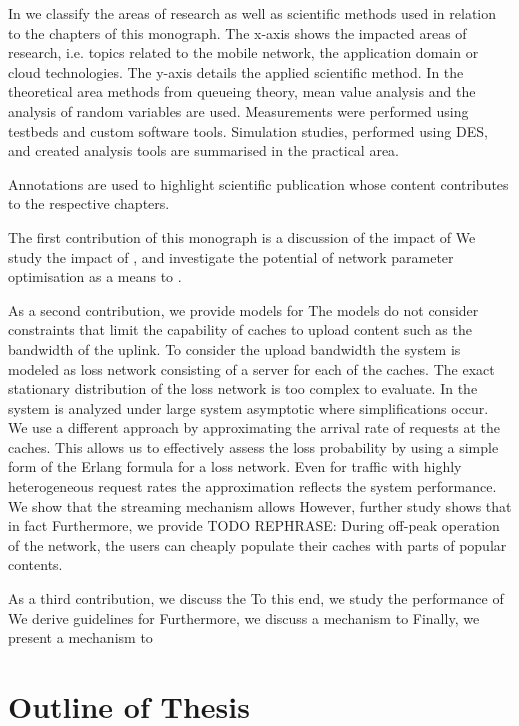 In  we classify the areas of research as well as scientific methods used in relation to the chapters of this monograph.
The x-axis shows the impacted areas of research, i.e. topics related to the mobile network, the application domain or cloud technologies.
The y-axis details the applied scientific method.
In the theoretical area methods from queueing theory, mean value analysis and the analysis of random variables are used.
Measurements were performed using testbeds and custom software tools.
Simulation studies, performed using \gls{DES}, and created analysis tools are summarised in the practical area.

Annotations are used to highlight scientific publication whose content contributes to the respective chapters.

The first contribution of this monograph is a discussion of the impact of
We study the impact of , and investigate the potential of network parameter optimisation as a means to .

As a second contribution, we provide models for
The models do not consider constraints that limit the capability of caches to upload content such as the bandwidth of the uplink.
To consider the upload bandwidth the system is modeled as loss network consisting of a server for each of the caches. The exact stationary distribution of the loss network is too complex to evaluate.
In \cite{tan2013optimal} the system is analyzed under large system asymptotic where simplifications occur.
We use a different approach by approximating the arrival rate of requests at the caches.
This allows us to effectively assess the loss probability by using a simple form of the Erlang formula for a loss network.
Even for traffic with highly heterogeneous request rates the approximation reflects the system performance.
We show that the streaming mechanism allows
However, further study shows that in fact
Furthermore, we provide
TODO REPHRASE: During off-peak operation of the network, the users can cheaply populate their caches with parts of popular contents.

As a third contribution, we discuss the
To this end, we study the performance of
We derive guidelines for
Furthermore, we discuss a mechanism to
Finally, we present a mechanism to

\section{Outline of Thesis}\label{sec:introduction:outline}

